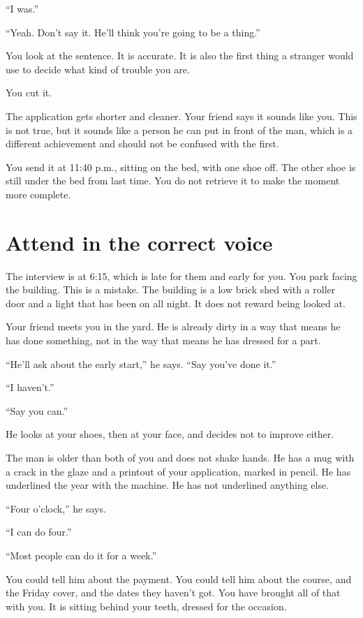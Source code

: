 \documentclass[11pt,oneside]{book}
\begin{document}
``I was.''

``Yeah. Don't say it. He'll think you're going to be a thing.''

You look at the sentence. It is accurate. It is also the first thing a stranger would use to decide what kind of trouble you are.

You cut it.

The application gets shorter and cleaner. Your friend says it sounds like you. This is not true, but it sounds like a person he can put in front of the man, which is a different achievement and should not be confused with the first.

You send it at 11:40 p.m., sitting on the bed, with one shoe off. The other shoe is still under the bed from last time. You do not retrieve it to make the moment more complete.

\section*{Attend in the correct voice}

The interview is at 6:15, which is late for them and early for you. You park facing the building. This is a mistake. The building is a low brick shed with a roller door and a light that has been on all night. It does not reward being looked at.

Your friend meets you in the yard. He is already dirty in a way that means he has done something, not in the way that means he has dressed for a part.

``He'll ask about the early start,'' he says. ``Say you've done it.''

``I haven't.''

``Say you can.''

He looks at your shoes, then at your face, and decides not to improve either.

The man is older than both of you and does not shake hands. He has a mug with a crack in the glaze and a printout of your application, marked in pencil. He has underlined the year with the machine. He has not underlined anything else.

``Four o'clock,'' he says.

``I can do four.''

``Most people can do it for a week.''

You could tell him about the payment. You could tell him about the course, and the Friday cover, and the dates they haven't got. You have brought all of that with you. It is sitting behind your teeth, dressed for the occasion.
\end{document}

